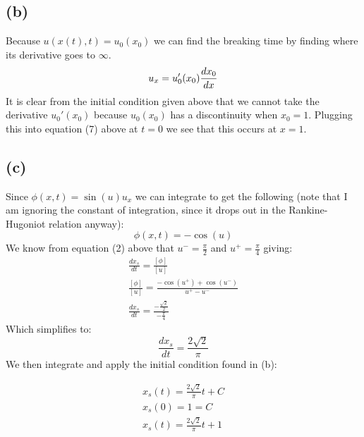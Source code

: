 \documentclass{article}
\begin{document}
\subsection*{(b)}

Because $u(x(t), t) = u_0(x_0)$ we can find the breaking time by finding where its derivative goes to $\infty$. 
\begin{equation}
u_x = u_0'(x_0)\frac{dx_0}{dx}\\
\end{equation}
It is clear from the initial condition given above that we cannot take the derivative $u_0'(x_0)$ because $u_0(x_0)$ has a discontinuity when $x_0 = 1$. Plugging this into equation (7) above at $t=0$ we see that this occurs at $x = 1$.
\subsection*{(c)}
Since $\phi(x,t) = \sin(u)u_x$ we can integrate to get the following (note that I am ignoring the constant of integration, since it drops out in the Rankine-Hugoniot relation anyway):
\begin{equation}
\phi(x, t) = -\cos(u)
\end{equation}
We know from equation (2) above that $u^- = \frac{\pi}{2}$ and $u^+ = \frac{\pi}{4}$ giving:
\begin{equation}
\begin{aligned}
\frac{dx_s}{dt} = \frac{[\phi]}{[u]}\\
\frac{[\phi]}{[u]} = \frac{-\cos(u^+) + \cos(u^-)}{u^+ - u^-}\\
\frac{dx_s}{dt} = \frac{-\frac{\sqrt{2}}{2}}{-\frac{\pi}{4}}
\end{aligned}
\end{equation}
Which simplifies to:
\begin{equation}
\frac{dx_s}{dt} = \frac{2\sqrt{2}}{\pi}
\end{equation}
We then integrate and apply the initial condition found in (b):
\begin{tcolorbox}[minipage,colback=white,arc=0pt,outer arc=0pt]
\begin{equation}
\begin{aligned}
x_s(t) = \frac{2\sqrt{2}}{\pi}t + C\\
x_s(0) = 1 = C\\
x_s(t) = \frac{2\sqrt{2}}{\pi}t + 1
\end{aligned}
\end{equation}
\end{tcolorbox}
\end{document}
